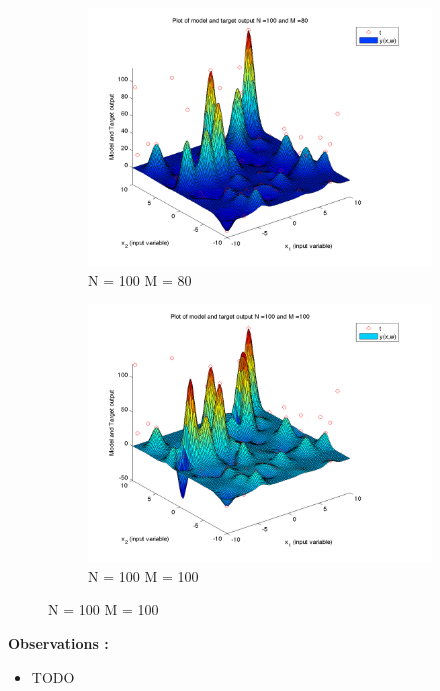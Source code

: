 \documentclass{article}
\begin{document}
\begin{figure}[H]
\begin{subfigure}{.5\textwidth}
\centering
\includegraphics[width=\linewidth]{D2/VaryingM_N100M80}
\caption{N = 100 M = 80}
\end{subfigure}
\begin{subfigure}{.5\textwidth}
\includegraphics[width=\linewidth]{D2/VaryingM_N100M100}
\caption{N = 100 M = 100}
\end{subfigure}


\end{figure}

\textbf{Observations : \newline}
\begin{itemize}
\item TODO
\end{itemize}
\end{document}
